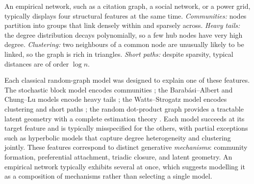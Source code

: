 \documentclass[12pt]{article}
\makeatletter
\def\section{\@startsection{section}{1}{\z@}{-0.16in}{0.04in}{\large\bf\raggedright}}
\newcommand{\1}{\mathbf{1}}
\makeatother
\begin{document}
\section{Introduction}
\label{sec:intro}

An empirical network, such as a citation graph, a social network, or a power grid, typically
displays four structural features at the same time. \emph{Communities:} nodes partition into groups
that link densely within and sparsely across. \emph{Heavy tails:} the degree distribution decays
polynomially, so a few hub nodes have very high degree. \emph{Clustering:} two neighbours of a
common node are unusually likely to be linked, so the graph is rich in triangles. \emph{Short
paths:} despite sparsity, typical distances are of order $\log n$.

Each classical random-graph model was designed to explain one of these features. The stochastic
block model encodes communities \citep{holland1983stochastic,abbe2018community}; the Barab\'asi--Albert and Chung--Lu
models encode heavy tails \citep{barabasi1999emergence,chung2002average}; the Watts--Strogatz model encodes
clustering and short paths \citep{watts1998collective}; the random dot-product graph provides a
tractable latent geometry with a complete estimation theory \citep{athreya2018statistical,rubin2022statistical}.
Each model succeeds at its target feature and is typically misspecified for the others, with
partial exceptions such as hyperbolic models that capture degree heterogeneity and clustering
jointly. These features correspond to
distinct generative \emph{mechanisms}: community formation, preferential attachment, triadic closure,
and latent geometry. An empirical network typically exhibits several at once, which suggests modelling
it as a composition of mechanisms rather than selecting a single model.
\end{document}
